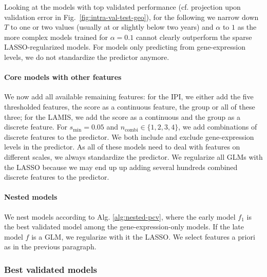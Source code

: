 Looking at the models with top validated performance (cf. projection upon validation error in Fig.\
\ref{fig:intra-val-test-geo}), for the following we narrow down $T$ to one or 
two values (usually at or slightly below two years) and $\alpha$ to $1$ as the more complex models 
trained for $\alpha = \num{0.1}$ cannot clearly outperform the sparse LASSO-regularized models. For 
models only predicting from gene-expression levels, we do not standardize the predictor anymore.

\paragraph{Core models with other features}
We now add all available remaining features: for the 
IPI, we either add the five thresholded features, the score as a continuous feature, the group or 
all of these three; for the LAMIS, %
we add the score as a continuous and the group as a discrete feature. For $s_\text{min} = \num{0.05}$ 
and $n_\text{combi} \in \{1, 2, 3, 4 \}$, we add combinations of discrete features to the predictor. 
We both include and exclude gene-expression levels in the predictor.
As all of these models need to deal with features on different scales, we always 
standardize the predictor. We regularize all GLMs with the LASSO because we may end up up adding 
several hundreds combined discrete features to the predictor.

\paragraph{Nested models}
We nest models according to Alg. \ref{alg:nested-pcv}, where the early model $f_1$ is the best 
validated model among the gene-expression-only models. If the late model $f$ is a GLM,
we regularize with it the LASSO. We select features a priori as in the previous 
paragraph.

\subsubsection{Best validated models}


